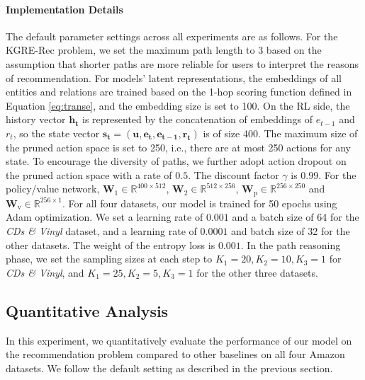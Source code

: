\documentclass[sigconf]{acmart}
\begin{document}
\paragraph{Implementation Details}
The default parameter settings across all experiments are as follows.
For the KGRE-Rec problem, we set the maximum path length to 3 based on the assumption that shorter paths are more reliable for users to interpret the reasons of recommendation.
For models' latent representations, the embeddings of all entities and relations are trained based on the 1-hop scoring function defined in Equation \ref{eq:transe}, and the embedding size is set to 100.
On the RL side, the history vector $\mathbf{h_t}$ is represented by the concatenation of embeddings of $e_{t-1}$ and $r_t$, so the state vector $\mathbf{s_t}=(\mathbf{u},\mathbf{e_t},\mathbf{e_{t-1}},\mathbf{r_t})$ is of size 400.
The maximum size of the pruned action space is set to 250, i.e., there are at most 250 actions for any state.
To encourage the diversity of paths, we further adopt action dropout on the pruned action space with a rate of $0.5$.
The discount factor $\gamma$ is $0.99$.
For the policy/value network, $\mathbf{W}_1\in\mathds{R}^{400\times512}$, $\mathbf{W}_2\in\mathds{R}^{512\times256}$, $\mathbf{W}_\text{p}\in\mathds{R}^{256\times250}$ and $\mathbf{W}_\text{v}\in\mathds{R}^{256\times 1}$.
For all four datasets, our model is trained for 50 epochs using Adam optimization. We set a learning rate of $0.001$ and a batch size of 64 for the \emph{CDs \& Vinyl} dataset, and a learning rate of $0.0001$ and batch size of 32 for the other datasets. The weight of the entropy loss is $0.001$.
In the path reasoning phase, we set the sampling sizes at each step to $K_1=20, K_2=10, K_3=1$ for \emph{CDs \& Vinyl}, and $K_1=25, K_2=5, K_3=1$ for the other three datasets.


\subsection{Quantitative Analysis}
In this experiment, we quantitatively evaluate the performance of our model on the recommendation problem compared to other baselines on all four Amazon datasets. We follow the default setting as described in the previous section. 
\end{document}
